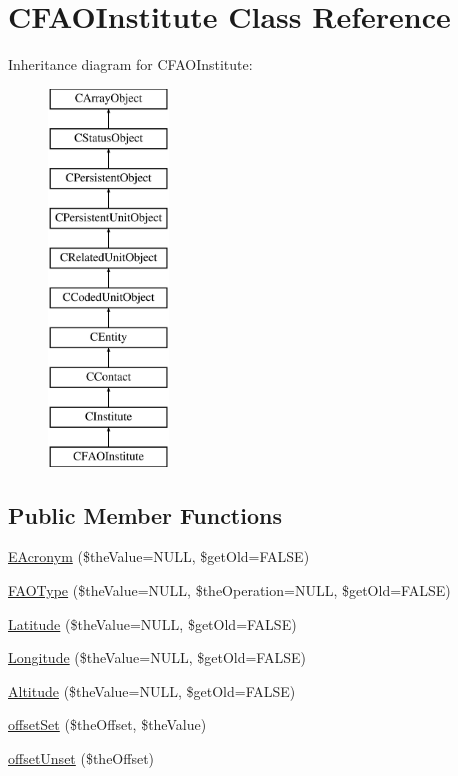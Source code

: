 \hypertarget{class_c_f_a_o_institute}{\section{C\-F\-A\-O\-Institute Class Reference}
\label{class_c_f_a_o_institute}
}
Inheritance diagram for C\-F\-A\-O\-Institute\-:\begin{figure}[H]
\begin{center}
\leavevmode
\includegraphics[height=10.000000cm]{class_c_f_a_o_institute}
\end{center}
\end{figure}
\subsection*{Public Member Functions}
\begin{DoxyCompactItemize}
\item 
\hyperlink{class_c_f_a_o_institute_af95063ebfd051df61eb523c47348d0d7}{E\-Acronym} (\$the\-Value=N\-U\-L\-L, \$get\-Old=F\-A\-L\-S\-E)
\item 
\hyperlink{class_c_f_a_o_institute_a6789e2ebcc8e919608aae8ec9956deb6}{F\-A\-O\-Type} (\$the\-Value=N\-U\-L\-L, \$the\-Operation=N\-U\-L\-L, \$get\-Old=F\-A\-L\-S\-E)
\item 
\hyperlink{class_c_f_a_o_institute_a861953952a7016f57759ef63045932f6}{Latitude} (\$the\-Value=N\-U\-L\-L, \$get\-Old=F\-A\-L\-S\-E)
\item 
\hyperlink{class_c_f_a_o_institute_a2adf396b5ecf8fd9eedcedc95a504f56}{Longitude} (\$the\-Value=N\-U\-L\-L, \$get\-Old=F\-A\-L\-S\-E)
\item 
\hyperlink{class_c_f_a_o_institute_a79db828d6210b8a21280e4edd3416935}{Altitude} (\$the\-Value=N\-U\-L\-L, \$get\-Old=F\-A\-L\-S\-E)
\item 
\hyperlink{class_c_f_a_o_institute_ac819c5bfa381ffa0f78b34442d2ea3c2}{offset\-Set} (\$the\-Offset, \$the\-Value)
\item 
\hyperlink{class_c_f_a_o_institute_a3bd7c59a3da53ba8c3cd1d9d0ff5ae0a}{offset\-Unset} (\$the\-Offset)
\end{DoxyCompactItemize}
